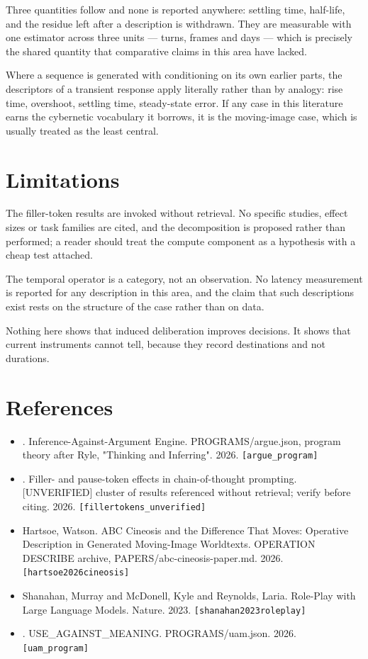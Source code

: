 \documentclass[11pt,a4paper]{article}
\begin{document}
Three quantities follow and none is reported anywhere: settling time, half-life, and the residue left after a description is withdrawn. They are measurable with one estimator across three units --- turns, frames and days --- which is precisely the shared quantity that comparative claims in this area have lacked.

Where a sequence is generated with conditioning on its own earlier parts, the descriptors of a transient response apply literally rather than by analogy: rise time, overshoot, settling time, steady-state error. If any case in this literature earns the cybernetic vocabulary it borrows, it is the moving-image case, which is usually treated as the least central.

\section{Limitations}
The filler-token results are invoked without retrieval. No specific studies, effect sizes or task families are cited, and the decomposition is proposed rather than performed; a reader should treat the compute component as a hypothesis with a cheap test attached.

The temporal operator is a category, not an observation. No latency measurement is reported for any description in this area, and the claim that such descriptions exist rests on the structure of the case rather than on data.

Nothing here shows that induced deliberation improves decisions. It shows that current instruments cannot tell, because they record destinations and not durations.

\section*{References}\small
\begin{itemize}\setlength\itemsep{0pt}
\item [author unrecorded]. Inference-Against-Argument Engine. PROGRAMS/argue.json, program theory after Ryle, "Thinking and Inferring". 2026. \texttt{[argue\_program]}
\item [author unrecorded]. Filler- and pause-token effects in chain-of-thought prompting. [UNVERIFIED] cluster of results referenced without retrieval; verify before citing. 2026. \texttt{[fillertokens\_unverified]}
\item Hartsoe, Watson. ABC Cineosis and the Difference That Moves: Operative Description in Generated Moving-Image Worldtexts. OPERATION DESCRIBE archive, PAPERS/abc-cineosis-paper.md. 2026. \texttt{[hartsoe2026cineosis]}
\item Shanahan, Murray and McDonell, Kyle and Reynolds, Laria. Role-Play with Large Language Models. Nature. 2023. \texttt{[shanahan2023roleplay]}
\item [author unrecorded]. USE\_AGAINST\_MEANING. PROGRAMS/uam.json. 2026. \texttt{[uam\_program]}
\end{itemize}\normalsize
\appendix
\end{document}
